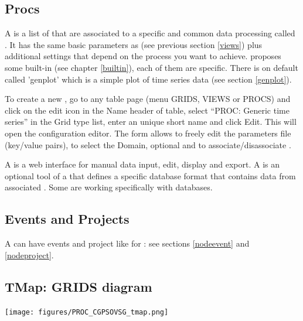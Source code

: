 \subsection{Procs}
\label{procs}

A  is a list of  that are associated to a specific and common data processing called . It has the same basic parameters as  (see previous section \ref{views}) plus additional settings that depend on the process you want to achieve. \webobs proposes some built-in  (see chapter \ref{builtin}), each of them are specific. There is on default  called 'genplot' which is a simple plot of time series data (see section \ref{genplot}).

To create a new , go to any  table page (menu GRIDS, VIEWS or PROCS) and click on the edit icon in the Name header of table, select ``PROC: Generic time series'' in the Grid type list, enter an unique short name and click Edit. This will open the  configuration editor. The form allows to freely edit the parameters file (key/value pairs), to select the Domain, optional  and to associate/disassociate .

\label{forms}

A  is a web interface for manual data input, edit, display and export. A  is an optional tool of a  that defines a specific database format that contains data from associated . Some  are working specifically with  databases.

\subsection{Events and Projects}

A  can have events and project like for : see sections \ref{nodeevent} and \ref{nodeproject}.

\subsection{TMap: GRIDS diagram}
\label{tmap}

\texttt{[image: figures/PROC\_CGPSOVSG\_tmap.png]}


